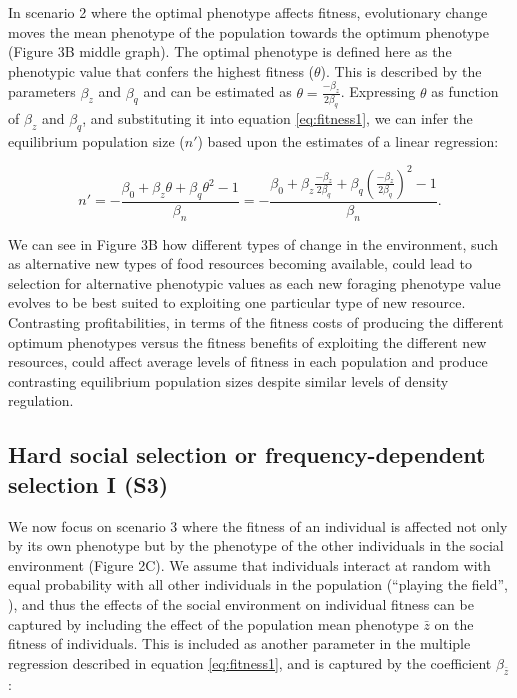 \documentclass{article}
\begin{document}
In scenario 2 where the optimal phenotype affects fitness, evolutionary change moves the mean phenotype of the population towards the optimum phenotype (Figure 3B middle graph). The optimal phenotype is defined here as the phenotypic value that confers the highest fitness ($\theta$). This is described by the parameters $\beta_{z}$ and $\beta_{q}$ and can be estimated as $\theta=\frac{-\beta_{z}}{2\beta_{q}}$. Expressing $\theta$ as function of $\beta_{z}$ and $\beta_{q}$, and substituting it into equation \ref{eq:fitness1}, we can infer the equilibrium population size ($n'$) based upon the estimates of a linear regression:

\begin{equation}\label{eq:equilibrium1}
n'=-\frac{\beta_{0}+ \beta_{z}\theta + \beta_{q}\theta^2-1}{\beta_n} = -\frac{\beta_{0}+ \beta_{z}\frac{-\beta_{z}}{2\beta_{q}} + \beta_{q}(\frac{-\beta_{z}}{2\beta_{q}})^2-1}{\beta_n}. 
\end{equation}

We can see in Figure 3B how different types of change in the environment, such as alternative new types of food resources becoming available, could lead to selection for alternative phenotypic values as each new foraging phenotype value evolves to be best suited to exploiting one particular type of new resource. Contrasting profitabilities, in terms of the fitness costs of producing the different optimum phenotypes versus the fitness benefits of exploiting the different new resources, could affect average levels of fitness in each population and produce contrasting equilibrium population sizes despite similar levels of density regulation. 

\subsection{Hard social selection or frequency-dependent selection I (S3)}

We now focus on scenario 3 where the fitness of an individual is affected not only by its own phenotype but by the phenotype of the other individuals in the social environment (Figure 2C). We assume that individuals interact at random with equal probability with all other individuals in the population (“playing the field”, \cite{MaynardSmith1982}), and thus the effects of the social environment on individual fitness can be captured by including the effect of the population mean phenotype $\bar{z}$ on the fitness of individuals. This is included as another parameter in the multiple regression described in equation \ref{eq:fitness1}, and is captured by the coefficient $\beta_{\bar{z}}$:  
\end{document}
